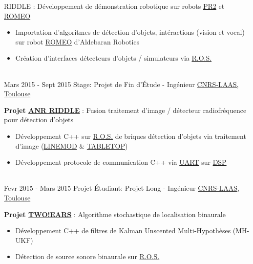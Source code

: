 \documentclass[letterpaper]{twentysecondcv} %
\begin{document}
\begin{twenty}
{{{        RIDDLE}} : Développement de démonstration robotique sur robots \href{http://www.willowgarage.com/pages/pr2/overview}{PR2} et \href{https://spectrum.ieee.org/automaton/robotics/humanoids/aldebaran-robotics-introduces-romeo-finally}{ROMEO}
    \begin{itemize}
    \item Importation d'algoritmes de détection d'objets, intéractions (vision
      et vocal) sur robot
      \href{https://spectrum.ieee.org/automaton/robotics/humanoids/aldebaran-robotics-introduces-romeo-finally}{ROMEO}
      d'Aldebaran Robotics
    \item Création d'interfaces détecteurs d'objets / simulateurs via \href{http://www.ros.org/}{R.O.S.}
    \end{itemize}
  }
  \\
  \twentyitem
  {Mars 2015 -}
  {Sept 2015}
  {Stage: Projet de Fin d'Étude - Ingénieur}
  {\href{https://www.laas.fr/public/fr}{CNRS-LAAS, Toulouse}}
  {}
  {
    \textbf{Projet
      \href{http://www.agence-nationale-recherche.fr/Project-ANR-12-CORD-0003}{ANR
        RIDDLE}} : Fusion traitement d'image / détecteur radiofréquence pour
    détection d'objets
    \begin{itemize}
    \item Développement C++ sur \href{http://www.ros.org/}{R.O.S.} de briques
      détection d'objets via traitement d'image
      (\href{http://www.stefan-hinterstoisser.com/papers/hinterstoisser2011linemod.pdf}{LINEMOD}
      \& \href{http://wiki.ros.org/tabletop_object_detector}{TABLETOP})
    \item Développement protocole de communication C++ via
      \href{https://en.wikipedia.org/wiki/Universal_asynchronous_receiver-transmitter}{UART}
      sur \href{https://en.wikipedia.org/wiki/Digital_signal_processor}{DSP}
    \end{itemize}
  }
  \\
  \twentyitem
  {Fevr 2015 -}
  {Mars 2015}
  {Projet Étudiant: Projet Long - Ingénieur}
  {\href{https://www.laas.fr/public/fr}{CNRS-LAAS, Toulouse}}
  {}
  {
    \textbf{Projet
      \href{http://twoears.eu/}{TWO!EARS}} : Algorithme stochastique de
    localisation binaurale
    \begin{itemize}
    \item Développement C++ de filtres de Kalman Unscented Multi-Hypothèses
      (MH-UKF)
    \item Détection de source sonore binaurale sur
      \href{http://www.ros.org/}{R.O.S.}
    \end{itemize}
}
\end{twenty}
\end{document}
